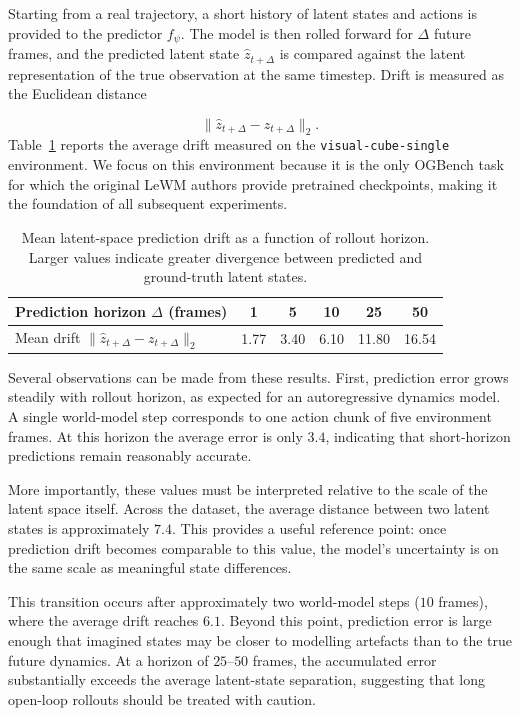 Starting from a real trajectory, a short history of latent states and
actions is provided to the predictor $f_\psi$. The model is then rolled
forward for $\Delta$ future frames, and the predicted latent state
$\hat z_{t+\Delta}$ is compared against the latent representation of
the true observation at the same timestep. Drift is measured as the
Euclidean distance

\begin{equation}
\|\hat z_{t+\Delta} - z_{t+\Delta}\|_2.
\end{equation}
Table~\ref{tab:drift} reports the average drift measured on the
\texttt{visual-cube-single} environment. We focus on this environment
because it is the only OGBench task for which the original LeWM
authors provide pretrained checkpoints, making it the foundation of
all subsequent experiments.

\begin{table}[h]
\centering
\caption{Mean latent-space prediction drift as a function of rollout
horizon. Larger values indicate greater divergence between predicted
and ground-truth latent states.}
\label{tab:drift}
\begin{tabular}{lccccc}
\toprule
Prediction horizon $\Delta$ (frames) & 1 & 5 & 10 & 25 & 50 \\
\midrule
Mean drift $\|\hat z_{t+\Delta}-z_{t+\Delta}\|_2$
& 1.77 & 3.40 & 6.10 & 11.80 & 16.54 \\
\bottomrule
\end{tabular}
\end{table}

Several observations can be made from these results. First, prediction
error grows steadily with rollout horizon, as expected for an
autoregressive dynamics model. A single world-model step corresponds
to one action chunk of five environment frames. At this horizon the
average error is only $3.4$, indicating that short-horizon predictions
remain reasonably accurate.

More importantly, these values must be interpreted relative to the
scale of the latent space itself. Across the dataset, the average
distance between two latent states is approximately $7.4$. This
provides a useful reference point: once prediction drift becomes
comparable to this value, the model's uncertainty is on the same scale
as meaningful state differences.

This transition occurs after approximately two world-model steps
($10$ frames), where the average drift reaches $6.1$. Beyond this
point, prediction error is large enough that imagined states may be
closer to modelling artefacts than to the true future dynamics. At a
horizon of $25$--$50$ frames, the accumulated error substantially
exceeds the average latent-state separation, suggesting that long
open-loop rollouts should be treated with caution.

